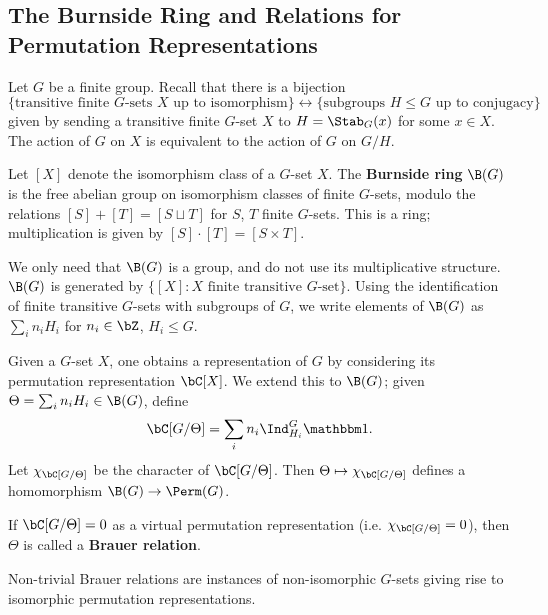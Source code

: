 \subsection{The Burnside Ring and Relations for Permutation Representations}

Let $G$ be a finite group. Recall that there is a bijection  
\[ \{ \text{transitive finite }G\text{-sets } X  \text{ up to isomorphism}\}\leftrightarrow  \{ \text{subgroups } H \leq G \text{ up to conjugacy} \} \] 
given by sending a transitive finite $G$-set $X$ to $H = \Stab_{G}(x)$ for some $x \in X$.  The action of $G$ on $X$ is equivalent to the action of $G$ on $G / H$. 

\begin{defn}\label{burnside}
Let $[X]$ denote the isomorphism class of a $G$-set $X$. 
The \textbf{Burnside ring} $\B(G)$ is the free abelian group on isomorphism classes of finite $G$-sets, modulo the relations  $[S] + [T] = [S \sqcup T]$ for $S$, $T$ finite $G$-sets. This is a ring; multiplication is given by $[S] \cdot [T] = [S \times T]$.
\end{defn}

We only need that $\B(G)$ is a group, and do not use its multiplicative structure. $\B(G)$ is generated by $\{ [X] \colon X \text{ finite transitive } G\text{-set}\}$. Using the identification of finite transitive $G$-sets with subgroups of $G$, we write elements of $\B(G)$ as $\sum_i n_i H_i$ for $n_i \in \bZ$, $H_i \leq G$. 

\begin{defn}
    Given a $G$-set $X$, one obtains a representation of $G$ by considering its permutation representation $\bC[X]$. We extend this to $\B(G)$; given $\Theta  = \sum_i n_i H_i \in \B(G)$, define 
    \[ \bC[G / \Theta ] = \sum_i n_i \Ind_{H_i}^G \trivial. \]
    Let $\chi_{\bC[G / \Theta]}$ be the character of $\bC[G / \Theta]$. Then  $\Theta \mapsto \chi_{\bC[G / \Theta]}$ defines a homomorphism $\B(G) \to \Perm(G)$.
\end{defn}

\begin{defn}\label{def-brauer}
If $\bC[G / \Theta] = 0$ as a virtual permutation representation (i.e. $\chi_{\bC[G / \Theta]} = 0$), then $\Theta$ is called a  \textbf{Brauer relation}.
\end{defn}

Non-trivial Brauer relations are instances of non-isomorphic $G$-sets giving rise to isomorphic permutation representations. 

